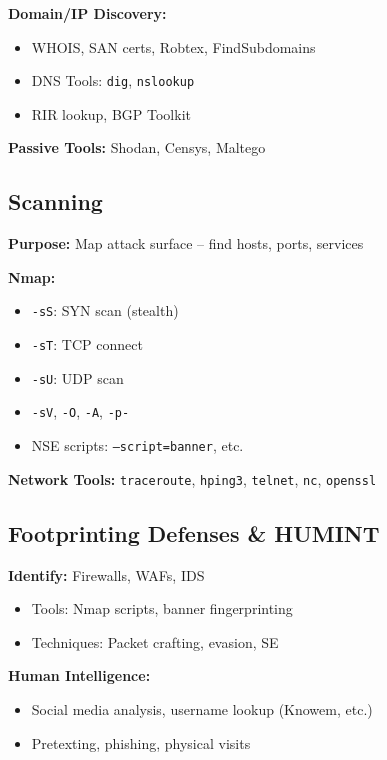 \textbf{Domain/IP Discovery:}
\begin{itemize}[noitemsep]
  \item WHOIS, SAN certs, Robtex, FindSubdomains
  \item DNS Tools: \texttt{dig}, \texttt{nslookup}
  \item RIR lookup, BGP Toolkit
\end{itemize}

\textbf{Passive Tools:} Shodan, Censys, Maltego

\subsection{Scanning}

\textbf{Purpose:} Map attack surface – find hosts, ports, services

\textbf{Nmap:}
\begin{itemize}[noitemsep]
  \item \texttt{-sS}: SYN scan (stealth)
  \item \texttt{-sT}: TCP connect
  \item \texttt{-sU}: UDP scan
  \item \texttt{-sV}, \texttt{-O}, \texttt{-A}, \texttt{-p-}
  \item NSE scripts: \texttt{--script=banner}, etc.
\end{itemize}

\textbf{Network Tools:} \texttt{traceroute}, \texttt{hping3}, \texttt{telnet}, \texttt{nc}, \texttt{openssl}

\subsection{Footprinting Defenses \& HUMINT}

\textbf{Identify:} Firewalls, WAFs, IDS
\begin{itemize}[noitemsep]
  \item Tools: Nmap scripts, banner fingerprinting
  \item Techniques: Packet crafting, evasion, SE
\end{itemize}

\textbf{Human Intelligence:}
\begin{itemize}[noitemsep]
  \item Social media analysis, username lookup (Knowem, etc.)
  \item Pretexting, phishing, physical visits
\end{itemize}

